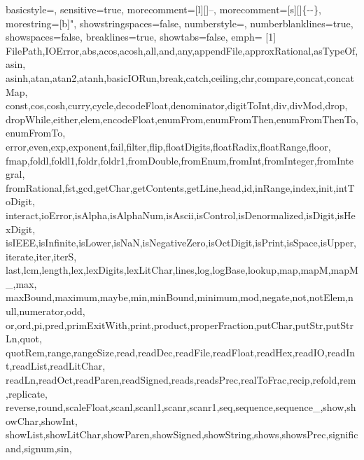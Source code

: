 \renewcommand{\ttdefault}{pcr}
 {
        basicstyle=\itfamily\small,
        sensitive=true,
        morecomment=[l][\ttfamily\tiny]{--},
        morecomment=[s][\ttfamily\tiny]{\{-}{-\}},
        morestring=[b]",
        showstringspaces=false,
        numberstyle=\tiny,
        numberblanklines=true,
        showspaces=false,
        breaklines=true,
        showtabs=false,
        emph=
        {[1]
                        FilePath,IOError,abs,acos,acosh,all,and,any,appendFile,approxRational,asTypeOf,asin,
                asinh,atan,atan2,atanh,basicIORun,break,catch,ceiling,chr,compare,concat,concatMap,
                const,cos,cosh,curry,cycle,decodeFloat,denominator,digitToInt,div,divMod,drop,
                dropWhile,either,elem,encodeFloat,enumFrom,enumFromThen,enumFromThenTo,enumFromTo,
                error,even,exp,exponent,fail,filter,flip,floatDigits,floatRadix,floatRange,floor,
                fmap,foldl,foldl1,foldr,foldr1,fromDouble,fromEnum,fromInt,fromInteger,fromIntegral,
                fromRational,fst,gcd,getChar,getContents,getLine,head,id,inRange,index,init,intToDigit,
                interact,ioError,isAlpha,isAlphaNum,isAscii,isControl,isDenormalized,isDigit,isHexDigit,
                isIEEE,isInfinite,isLower,isNaN,isNegativeZero,isOctDigit,isPrint,isSpace,isUpper,iterate,iter,iterS,
                last,lcm,length,lex,lexDigits,lexLitChar,lines,log,logBase,lookup,map,mapM,mapM_,max,
                maxBound,maximum,maybe,min,minBound,minimum,mod,negate,not,notElem,null,numerator,odd,
                or,ord,pi,pred,primExitWith,print,product,properFraction,putChar,putStr,putStrLn,quot,
                quotRem,range,rangeSize,read,readDec,readFile,readFloat,readHex,readIO,readInt,readList,readLitChar,
                readLn,readOct,readParen,readSigned,reads,readsPrec,realToFrac,recip,refold,rem,replicate,
                reverse,round,scaleFloat,scanl,scanl1,scanr,scanr1,seq,sequence,sequence_,show,showChar,showInt,
                showList,showLitChar,showParen,showSigned,showString,shows,showsPrec,significand,signum,sin,
}}
